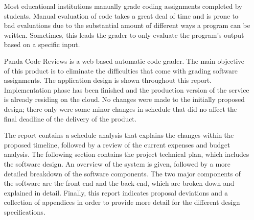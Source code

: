 
Most educational institutions manually grade coding assignments completed by
students. Manual evaluation of code takes a great deal of time and is prone to
bad evaluations due to the substantial amount of different ways a program can be
written. Sometimes, this leads the grader to only evaluate the program's output
based on a specific input.

Panda Code Reviews is a web-based automatic code grader. The main objective of
this product is to eliminate the difficulties that come with grading software assignments.
The application design is shown throughout this report. Implementation
phase has been finished and the production version of the service is already
residing on the cloud. No changes were made to the initially proposed design;
there only were some minor changes in schedule that did no affect the final deadline
of the delivery of the product.

The report contains a schedule analysis that explains the changes within the
proposed timeline, followed by a review of the current expenses and budget
analysis. The following section contains the project technical plan, which
includes the software design. An overview of the system is given, followed by a
more detailed breakdown of the software components. The two major components of
the software are the front end and the back end, which are broken down and
explained in detail. Finally, this report indicates proposal deviations and a
collection of appendices in order to provide more detail for the different
design specifications.
